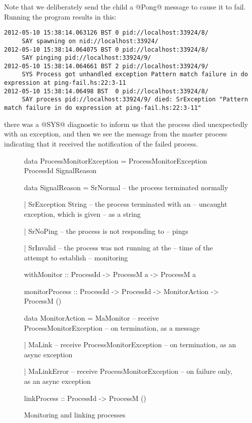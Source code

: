 \noindent Note that we deliberately send the child a @Pong@ message to
cause it to fail.  Running the program results in this:

\begin{verbatim}
2012-05-10 15:38:14.063126 BST 0 pid://localhost:33924/8/
     SAY spawning on nid://localhost:33924/
2012-05-10 15:38:14.064075 BST 0 pid://localhost:33924/8/
     SAY pinging pid://localhost:33924/9/
2012-05-10 15:38:14.064661 BST 2 pid://localhost:33924/9/
     SYS Process got unhandled exception Pattern match failure in do expression at ping-fail.hs:22:3-11
2012-05-10 15:38:14.06498 BST  0 pid://localhost:33924/8/
     SAY process pid://localhost:33924/9/ died: SrException "Pattern match failure in do expression at ping-fail.hs:22:3-11"
\end{verbatim}

\noindent there was a @SYS@ diagnostic to inform us that the process
died unexpectedly with an exception, and then we see the message from
the master process indicating that it received the notification of the
failed process.

\begin{figure}
\begin{haskell}
data ProcessMonitorException
 = ProcessMonitorException ProcessId SignalReason

data SignalReason
  = SrNormal           -- the process terminated normally

  | SrException String -- the process terminated with an
                       -- uncaught exception, which is given
                       -- as a string

  | SrNoPing           -- the process is not responding to
                       -- pings

  | SrInvalid          -- the process was not running at the
                       -- time of the attempt to establish
                       -- monitoring

withMonitor    :: ProcessId -> ProcessM a -> ProcessM a

monitorProcess :: ProcessId -> ProcessId -> MonitorAction
               -> ProcessM ()

data MonitorAction
  = MaMonitor   -- receive ProcessMonitorException
                -- on termination, as a message

  | MaLink      -- receive ProcessMonitorException
                -- on termination, as an async exception

  | MaLinkError -- receive ProcessMonitorException
                -- on failure only, as an async exception

linkProcess :: ProcessId -> ProcessM ()
\end{haskell}
\label{fig:remote-monitor}
\caption{Monitoring and linking processes}
\end{figure}

